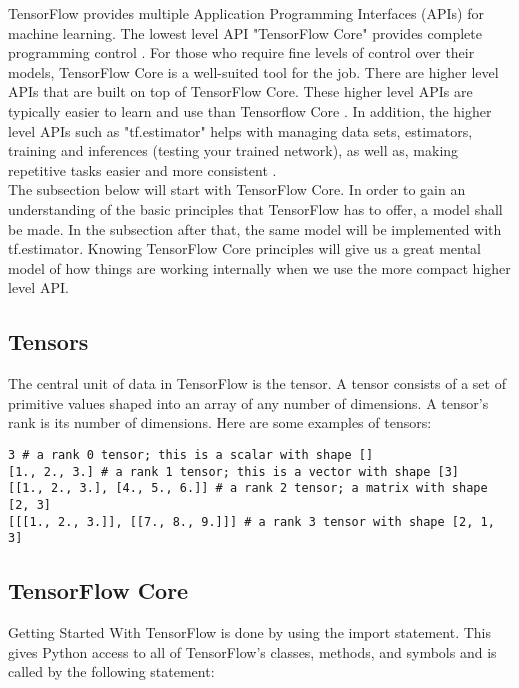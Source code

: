 TensorFlow provides multiple Application Programming Interfaces
(APIs) for machine learning. 
The lowest level API "TensorFlow Core" provides complete programming control \cite{tensorflow2015-whitepaper}. 
For those who require fine levels of control over their models,
TensorFlow Core is a well-suited tool for the job. There are higher level APIs that are built on top of TensorFlow Core.
These higher level APIs are typically easier to learn and use than Tensorflow Core \cite{tensorflow2015-whitepaper}.
In addition, the higher level APIs such as "tf.estimator" helps with managing data sets, estimators,
training and inferences (testing your trained network),
as well as, making repetitive tasks easier and more consistent
\cite{tensorflow2015-whitepaper}.\\

The subsection below will start with TensorFlow Core. 
In order to gain an understanding of the basic principles that TensorFlow has to offer, a model shall be made. 
In the subsection after that, the same model will be implemented with tf.estimator. 
Knowing TensorFlow Core principles will give us a great mental model of how things are working internally when we use the more compact higher level API.

\subsection{Tensors}
The central unit of data in TensorFlow is the tensor. 
A tensor consists of a set of primitive values shaped into an array of any number of dimensions. 
A tensor's rank is its number of dimensions. 
Here are some examples of tensors:

\begin{adjustbox}{width=\textwidth}
\begin{lstlisting}
3 # a rank 0 tensor; this is a scalar with shape []
[1., 2., 3.] # a rank 1 tensor; this is a vector with shape [3]
[[1., 2., 3.], [4., 5., 6.]] # a rank 2 tensor; a matrix with shape [2, 3]
[[[1., 2., 3.]], [[7., 8., 9.]]] # a rank 3 tensor with shape [2, 1, 3]
\end{lstlisting} 
\end{adjustbox}


\subsection{TensorFlow Core}
Getting Started With TensorFlow is done by using the import statement. 
This gives Python access to all of TensorFlow's classes,
methods, and symbols and is called by the following statement:

